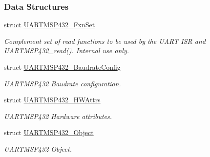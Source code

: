 \subsubsection*{Data Structures}
\begin{DoxyCompactItemize}
\item 
struct \hyperlink{struct_u_a_r_t_m_s_p432___fxn_set}{U\+A\+R\+T\+M\+S\+P432\+\_\+\+Fxn\+Set}
\begin{DoxyCompactList}\small\item\em Complement set of read functions to be used by the U\+A\+R\+T I\+S\+R and U\+A\+R\+T\+M\+S\+P432\+\_\+read(). Internal use only. \end{DoxyCompactList}\item 
struct \hyperlink{struct_u_a_r_t_m_s_p432___baudrate_config}{U\+A\+R\+T\+M\+S\+P432\+\_\+\+Baudrate\+Config}
\begin{DoxyCompactList}\small\item\em U\+A\+R\+T\+M\+S\+P432 Baudrate configuration. \end{DoxyCompactList}\item 
struct \hyperlink{struct_u_a_r_t_m_s_p432___h_w_attrs}{U\+A\+R\+T\+M\+S\+P432\+\_\+\+H\+W\+Attrs}
\begin{DoxyCompactList}\small\item\em U\+A\+R\+T\+M\+S\+P432 Hardware attributes. \end{DoxyCompactList}\item 
struct \hyperlink{struct_u_a_r_t_m_s_p432___object}{U\+A\+R\+T\+M\+S\+P432\+\_\+\+Object}
\begin{DoxyCompactList}\small\item\em U\+A\+R\+T\+M\+S\+P432 Object. \end{DoxyCompactList}\end{DoxyCompactItemize}
